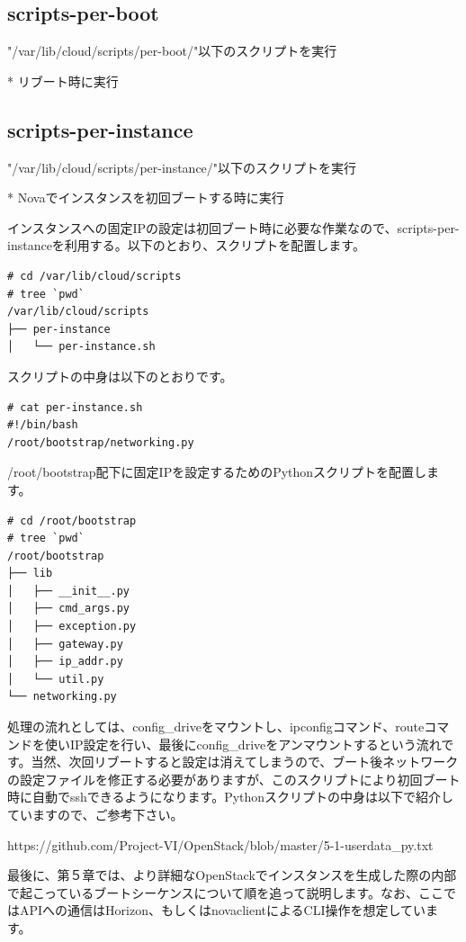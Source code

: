 \documentclass[8pt,b5paper,tombo,openany]{jsbook}
\begin{document}
\subsection{scripts-per-boot}

"/var/lib/cloud/scripts/per-boot/"以下のスクリプトを実行

* リブート時に実行

\subsection{scripts-per-instance}

"/var/lib/cloud/scripts/per-instance/"以下のスクリプトを実行

* Novaでインスタンスを初回ブートする時に実行

インスタンスへの固定IPの設定は初回ブート時に必要な作業なので、scripts-per-instanceを利用する。以下のとおり、スクリプトを配置します。

\begin{verbatim}
# cd /var/lib/cloud/scripts
# tree `pwd`
/var/lib/cloud/scripts
├── per-instance
│   └── per-instance.sh
\end{verbatim}

スクリプトの中身は以下のとおりです。

\begin{lstlisting}
# cat per-instance.sh
#!/bin/bash
/root/bootstrap/networking.py
\end{lstlisting}

/root/bootstrap配下に固定IPを設定するためのPythonスクリプトを配置します。

{\footnotesize
\begin{verbatim}
# cd /root/bootstrap
# tree `pwd`
/root/bootstrap
├── lib
│   ├── __init__.py
│   ├── cmd_args.py
│   ├── exception.py
│   ├── gateway.py
│   ├── ip_addr.py
│   └── util.py
└── networking.py
\end{verbatim}
}

処理の流れとしては、config\_driveをマウントし、ipconfigコマンド、routeコマンドを使いIP設定を行い、最後にconfig\_driveをアンマウントするという流れです。当然、次回リブートすると設定は消えてしまうので、ブート後ネットワークの設定ファイルを修正する必要がありますが、このスクリプトにより初回ブート時に自動でsshできるようになります。Pythonスクリプトの中身は以下で紹介していますので、ご参考下さい。

https://github.com/Project-VI/OpenStack/blob/master/5-1-userdata\_py.txt

最後に、第５章では、より詳細なOpenStackでインスタンスを生成した際の内部で起こっているブートシーケンスについて順を追って説明します。なお、ここではAPIへの通信はHorizon、もしくはnovaclientによるCLI操作を想定しています。
\end{document}
